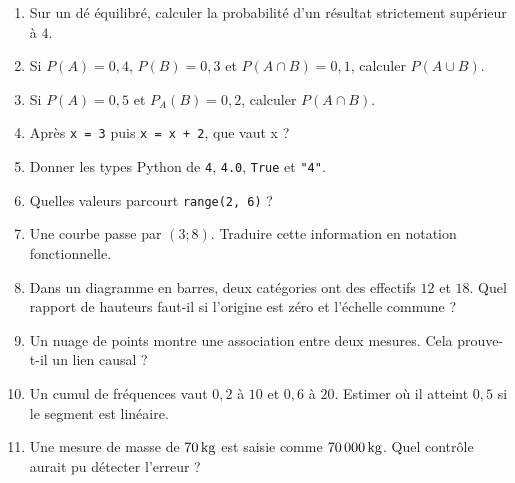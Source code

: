 \documentclass[11pt,a4paper,oneside]{book}
\begin{document}
\begin{enumerate}
\item Sur un dé équilibré, calculer la probabilité d'un résultat strictement supérieur à $4$.
\item Si $P(A)=0{,}4$, $P(B)=0{,}3$ et $P(A\cap B)=0{,}1$, calculer $P(A\cup B)$.
\item Si $P(A)=0{,}5$ et $P_A(B)=0{,}2$, calculer $P(A\cap B)$.
\item Après \texttt{x = 3} puis \texttt{x = x + 2}, que vaut x ?
\item Donner les types Python de \texttt{4}, \texttt{4.0}, \texttt{True} et \texttt{"4"}.
\item Quelles valeurs parcourt \texttt{range(2, 6)} ?
\item Une courbe passe par $(3;8)$. Traduire cette information en notation fonctionnelle.
\item Dans un diagramme en barres, deux catégories ont des effectifs $12$ et $18$. Quel rapport de hauteurs faut-il si l'origine est zéro et l'échelle commune ?
\item Un nuage de points montre une association entre deux mesures. Cela prouve-t-il un lien causal ?
\item Un cumul de fréquences vaut $0{,}2$ à $10$ et $0{,}6$ à $20$. Estimer où il atteint $0{,}5$ si le segment est linéaire.
\item Une mesure de masse de $70\,\mathrm{kg}$ est saisie comme $70\,000\,\mathrm{kg}$. Quel contrôle aurait pu détecter l'erreur ?
\end{enumerate}
\end{document}
